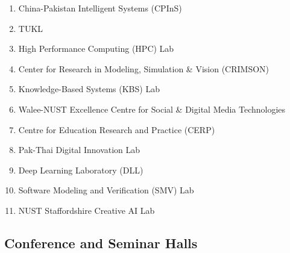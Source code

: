 \begin{enumerate}[noitemsep, topsep=0pt]
\def\labelenumi{(\alph{enumi})}

\item
  China-Pakistan Intelligent Systems (CPInS)

\item
  TUKL

\item
  High Performance Computing (HPC) Lab

\item
  Center for Research in Modeling, Simulation \& Vision (CRIMSON)

\item
  Knowledge-Based Systems (KBS) Lab

\item
  Walee-NUST Excellence Centre for Social \& Digital Media Technologies

\item
  Centre for Education Research and Practice (CERP)

\item
  Pak-Thai Digital Innovation Lab

\item
  Deep Learning Laboratory (DLL)

\item
  Software Modeling and Verification (SMV) Lab

\item
  NUST Staffordshire Creative AI Lab

\end{enumerate}




\hypertarget{Conference and Seminar Halls }{%
\subsection{\texorpdfstring{Conference and Seminar Halls }{Conference and Seminar Halls }}\label{Conference and Seminar Halls}}

